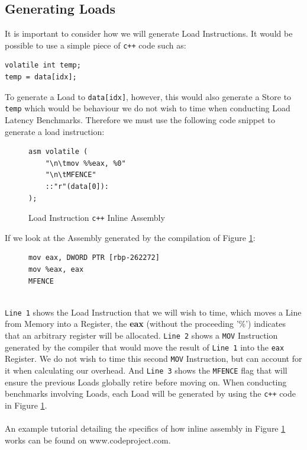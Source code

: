 \documentclass[bsc,frontabs,twoside,singlespacing,parskip,deptreport]{infthesis}     %
\begin{document}

\subsection{Generating Loads}\label{sec:gen-loads}
It is important to consider how we will generate Load Instructions. It would be possible to use a simple piece of \texttt{c++} code such as:
\begin{verbatim}
volatile int temp;
temp = data[idx];
\end{verbatim}
To generate a Load to \texttt{data[idx]}, however, this would also generate a Store to \texttt{temp} which would be behaviour we do not wish to time when conducting Load Latency Benchmarks. Therefore we must use the following code snippet to generate a load instruction:
\begin{figure}[!h]
    \centering
    \begin{minipage}{0.4\textwidth}
    \begin{verbatim}
asm volatile (
    "\n\tmov %%eax, %0"
    "\n\tMFENCE"
    ::"r"(data[0]):
);
    \end{verbatim}
    \end{minipage}
    \caption{Load Instruction \texttt{c++} Inline Assembly }
    \label{fig:load-inst-code}
\end{figure}

If we look at the Assembly generated by the compilation of Figure \ref{fig:load-inst-code}:
\begin{figure}[!h]
    \centering
    \begin{minipage}{0.4\textwidth}
    \begin{verbatim}
mov eax, DWORD PTR [rbp-262272]
mov %eax, eax
MFENCE
    \end{verbatim}
    \end{minipage}
\end{figure} \\
\texttt{Line 1} shows the Load Instruction that we will wish to time, which moves a Line from Memory into a Register, the \textbf{eax} (without the proceeding '\%') indicates that an arbitrary register will be allocated. \texttt{Line 2} shows a \texttt{MOV} Instruction generated by the compiler that would move the result of \texttt{Line 1} into the \texttt{eax} Register. We do not wish to time this second \texttt{MOV} Instruction, but can account for it when calculating our overhead. And \texttt{Line 3} shows the \texttt{MFENCE} flag that will ensure the previous Loads globally retire before moving on. When conducting benchmarks involving Loads, each Load will be generated by using the \texttt{c++} code in Figure \ref{fig:load-inst-code}. \\
\\
An example tutorial detailing the specifics of how inline assembly in Figure \ref{fig:load-inst-code} works can be found on www.codeproject.com\cite{inline_asm_tut}.
\end{document}
